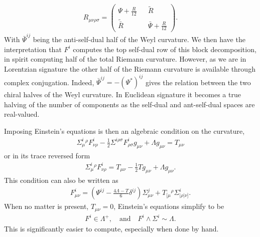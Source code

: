 \documentclass[10pt]{report}
\theoremstyle{definition}
\begin{document}
\begin{align}
R_{\mu\nu\rho\sigma} = \begin{pmatrix}
        \Psi + \frac{R}{12} && \tilde{R} \\ \tilde{\bar{R}} && \bar{\Psi} + \frac{R}{12}
    \end{pmatrix}. \label{eq:pleb-riemann-curvature-sd-asd-decomposition}    
\end{align}
With $\bar{\Psi}^{ij}$ being the anti-self-dual half of the Weyl curvature. We then have the interpretation that $F^i$ computes the top self-dual row of this block decomposition, in spirit computing half of the total Riemann curvature. However, as we are in Lorentzian signature the other half of the Riemann curvature is available through complex conjugation. Indeed, $\bar{\Psi}^{ij} = -(\Psi^*)^{ij}$ gives the relation between the two chiral halves of the Weyl curvature. In Euclidean signature it becomes a true halving of the number of components as the self-dual and ant-self-dual spaces are real-valued.

Imposing Einstein's equations is then an algebraic condition on the curvature,
\begin{align}
    \Sigma^i_\mu{}^\rho F^i_{\nu\rho} - \frac{1}{2} \Sigma^{i\rho\sigma} F^i_{\rho\sigma} g_{\mu\nu} + \Lambda g_{\mu\nu} = T_{\mu\nu}
\end{align}
or in its trace reversed form 
\begin{align}
    \Sigma^i_\mu{}^\rho F^i_{\nu\rho} = T_{\mu\nu} - \frac{1}{2} T g_{\mu\nu} + \Lambda g_{\mu\nu}.
\end{align}
This condition can also be written as
\begin{align}
    F^i_{\mu\nu} = \left( \Psi^{ij} - \frac{4\Lambda - T}{6} \delta^{ij} \right) \Sigma^j_{\mu\nu} + T_{[\mu}{}^\rho \Sigma^i_{|\rho|\nu]}.
\end{align}
When no matter is present, $T_{\mu\nu} = 0$, Einstein's equations simplify to be
\begin{align}
    F^i \in \Lambda^+, \quad \textrm{and} \quad F^i \wedge \Sigma^i \sim \Lambda.
\end{align} 
This is significantly easier to compute, especially when done by hand.
\end{document}
